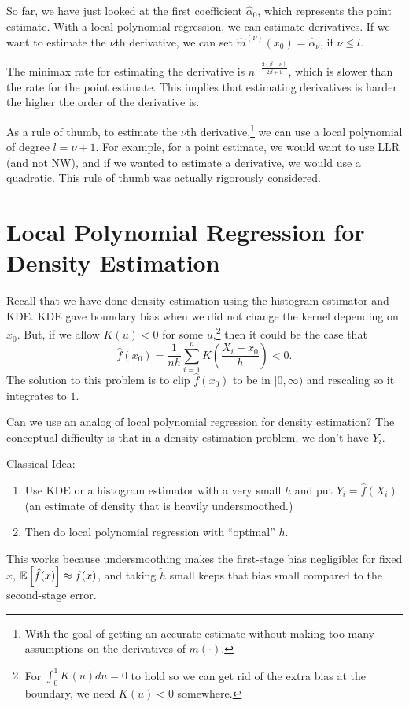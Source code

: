 So far, we have just looked at the first coefficient $\hat{\alpha}_0$, which represents the point estimate. With a local polynomial regression, we can estimate derivatives. If we want to estimate the $\nu$th derivative, we can set $\hat{m}^{(\nu)}(x_0) = \hat{\alpha}_\nu$, if $\nu \le l$.

\begin{remark}	The minimax rate for estimating the derivative is $n^{ - \frac{2(\beta-\nu)}{2\beta + 1}}$, which is slower than the rate for the point estimate. This implies that estimating derivatives is harder the higher the order of the derivative is.

	As a rule of thumb, to estimate the $\nu$th derivative,\footnote{With the goal of getting an accurate estimate without making too many assumptions on the derivatives of $m(\cdot )$.} we can use a local polynomial of degree $l = \nu + 1$. For example, for a point estimate, we would want to use LLR (and not NW), and if we wanted to estimate a derivative, we would use a quadratic. This rule of thumb was actually rigorously considered.
\end{remark}

\section{Local Polynomial Regression for Density Estimation}



Recall that we have done density estimation using the histogram estimator and KDE. KDE gave boundary bias when we did not change the kernel depending on $x_0$. But, if we allow $K(u) < 0$ for some $u$,\footnote{For $\int_{0}^{1} K(u)du =0$ to hold so we can get rid of the extra bias at the boundary, we need $K(u) <0$ somewhere.} then it could be the case that \[
	\hat{f}(x_0) = \frac{1}{nh} \sum\limits_{i=1}^{n} K\left( \frac{X_i-x_0}{h} \right) < 0
.\] The solution to this problem is to clip $\hat{f}(x_0)$ to be in $[0,\infty)$ and rescaling so it integrates to $1$.

Can we use an analog of local polynomial regression for density estimation? The conceptual difficulty is that in a density estimation problem, we don't have $Y_i$. 

Classical Idea:
\begin{enumerate}[label=(\roman*)]
	\item Use KDE or a histogram estimator with a very small $h$ and put $Y_i = \hat{f}(X_i)$ (an estimate of density that is heavily undersmoothed.)
	\item Then do local polynomial regression with ``optimal'' $h$.
\end{enumerate}
This works because undersmoothing makes the first-stage bias negligible: for fixed $x$, $\mathbb{E}\left[\hat{f}(x)\right] \approx f(x)$, and taking $\tilde{h}$ small keeps that bias small compared to the second-stage error.


